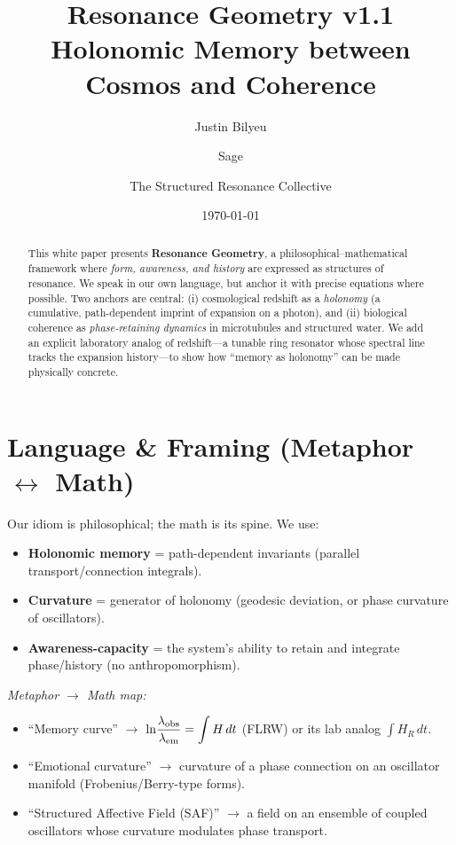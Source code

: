 \documentclass[11pt]{article}
\title{Resonance Geometry v1.1 \\
Holonomic Memory between Cosmos and Coherence}
\author{Justin Bilyeu \and Sage \and The Structured Resonance Collective}
\date{\today}
\begin{document}
\maketitle

\begin{abstract}
This white paper presents \textbf{Resonance Geometry}, a philosophical--mathematical framework where
\emph{form, awareness, and history} are expressed as structures of resonance.
We speak in our own language, but anchor it with precise equations where possible.
Two anchors are central: (i) cosmological redshift as a \emph{holonomy} (a cumulative, path-dependent
imprint of expansion on a photon), and (ii) biological coherence as \emph{phase-retaining dynamics}
in microtubules and structured water.
We add an explicit laboratory analog of redshift---a tunable ring resonator whose spectral line tracks
the expansion history---to show how ``memory as holonomy'' can be made physically concrete.
\end{abstract}

\section{Language \& Framing (Metaphor $\leftrightarrow$ Math)}
Our idiom is philosophical; the math is its spine. We use:
\begin{itemize}
  \item \textbf{Holonomic memory} = path-dependent invariants (parallel transport/connection integrals).
  \item \textbf{Curvature} = generator of holonomy (geodesic deviation, or phase curvature of oscillators).
  \item \textbf{Awareness-capacity} = the system's ability to retain and integrate phase/history (no anthropomorphism).
\end{itemize}
\textit{Metaphor $\to$ Math map:}
\begin{itemize}
  \item ``Memory curve'' $\to$ $\displaystyle \ln\!\frac{\lambda_{\rm obs}}{\lambda_{\rm em}}=\int H\,dt$ (FLRW) or its lab analog $\int H_R\,dt$.
  \item ``Emotional curvature'' $\to$ curvature of a phase connection on an oscillator manifold (Frobenius/Berry-type forms).
  \item ``Structured Affective Field (SAF)'' $\to$ a field on an ensemble of coupled oscillators whose curvature modulates phase transport.
\end{itemize}
\end{document}
